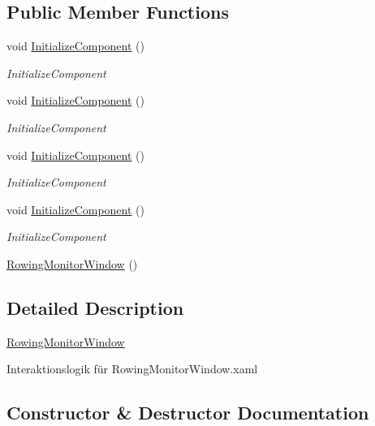 \subsection*{Public Member Functions}
\begin{DoxyCompactItemize}
\item 
void \hyperlink{class_rowing_monitor_1_1_rowing_monitor_window_ace5d64ad5ace3448f5390d3bb57ddc2e}{Initialize\+Component} ()
\begin{DoxyCompactList}\small\item\em Initialize\+Component \end{DoxyCompactList}\item 
void \hyperlink{class_rowing_monitor_1_1_rowing_monitor_window_ace5d64ad5ace3448f5390d3bb57ddc2e}{Initialize\+Component} ()
\begin{DoxyCompactList}\small\item\em Initialize\+Component \end{DoxyCompactList}\item 
void \hyperlink{class_rowing_monitor_1_1_rowing_monitor_window_ace5d64ad5ace3448f5390d3bb57ddc2e}{Initialize\+Component} ()
\begin{DoxyCompactList}\small\item\em Initialize\+Component \end{DoxyCompactList}\item 
void \hyperlink{class_rowing_monitor_1_1_rowing_monitor_window_ace5d64ad5ace3448f5390d3bb57ddc2e}{Initialize\+Component} ()
\begin{DoxyCompactList}\small\item\em Initialize\+Component \end{DoxyCompactList}\item 
\hyperlink{class_rowing_monitor_1_1_rowing_monitor_window_aa2e686844acc551384743df9d9eebf42}{Rowing\+Monitor\+Window} ()
\end{DoxyCompactItemize}


\subsection{Detailed Description}
\hyperlink{class_rowing_monitor_1_1_rowing_monitor_window}{Rowing\+Monitor\+Window} 

Interaktionslogik für Rowing\+Monitor\+Window.\+xaml 

\subsection{Constructor \& Destructor Documentation}
\mbox{\label{class_rowing_monitor_1_1_rowing_monitor_window_aa2e686844acc551384743df9d9eebf42}} 
